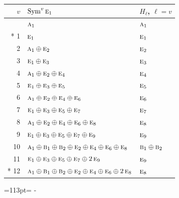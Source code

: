 \documentclass[10pt,a4paper]{article}
\newcommand{\needspace}[1]{\par\penalty-100\begingroup\dimen0=#1\relax\dimen2=\pagegoal
  \advance\dimen2-\pagetotal\ifdim\dimen0>\dimen2\relax\ifdim\dimen2>0pt\vfil\break\fi\fi
  \endgroup}
\numberwithin{equation}{section}
\newcommand{\irr}[1]{\text{\normalfont\scshape #1}}
\begin{document}
{\small\begin{longtable}{@{}rll@{}}\toprule
$v$ & $\operatorname{Sym}^{v}\irr{e}_{1}$ & $H_\ell$, $\ell = v$\\\midrule\endhead
\bottomrule\endfoot\endlastfoot
0 & $\irr{a}_{1}$ & $\irr{a}_{1}$\\*
1 & $\irr{e}_{1}$ & $\irr{e}_{1}$\\
2 & $\irr{a}_{1} \oplus \irr{e}_{2}$ & $\irr{e}_{2}$\\
3 & $\irr{e}_{1} \oplus \irr{e}_{3}$ & $\irr{e}_{3}$\\
4 & $\irr{a}_{1} \oplus \irr{e}_{2} \oplus \irr{e}_{4}$ & $\irr{e}_{4}$\\
5 & $\irr{e}_{1} \oplus \irr{e}_{3} \oplus \irr{e}_{5}$ & $\irr{e}_{5}$\\
6 & $\irr{a}_{1} \oplus \irr{e}_{2} \oplus \irr{e}_{4} \oplus \irr{e}_{6}$ & $\irr{e}_{6}$\\
7 & $\irr{e}_{1} \oplus \irr{e}_{3} \oplus \irr{e}_{5} \oplus \irr{e}_{7}$ & $\irr{e}_{7}$\\
8 & $\irr{a}_{1} \oplus \irr{e}_{2} \oplus \irr{e}_{4} \oplus \irr{e}_{6} \oplus \irr{e}_{8}$ & $\irr{e}_{8}$\\
9 & $\irr{e}_{1} \oplus \irr{e}_{3} \oplus \irr{e}_{5} \oplus \irr{e}_{7} \oplus \irr{e}_{9}$ & $\irr{e}_{9}$\\
10 & $\irr{a}_{1} \oplus \irr{b}_{1} \oplus \irr{b}_{2} \oplus \irr{e}_{2} \oplus \irr{e}_{4} \oplus \irr{e}_{6} \oplus \irr{e}_{8}$ & $\irr{b}_{1} \oplus \irr{b}_{2}$\\
11 & $\irr{e}_{1} \oplus \irr{e}_{3} \oplus \irr{e}_{5} \oplus \irr{e}_{7} \oplus 2\,\irr{e}_{9}$ & $\irr{e}_{9}$\\*
12 & $\irr{a}_{1} \oplus \irr{b}_{1} \oplus \irr{b}_{2} \oplus \irr{e}_{2} \oplus \irr{e}_{4} \oplus \irr{e}_{6} \oplus 2\,\irr{e}_{8}$ & $\irr{e}_{8}$\\
\bottomrule\end{longtable}}
\needspace{113pt}
\end{document}
